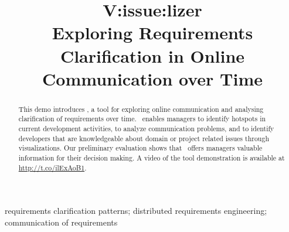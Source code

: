 
\title{V:issue:lizer\\Exploring Requirements Clarification in Online Communication over Time}


\author{
}

\maketitle


\begin{abstract}
This demo introduces \viss, a tool for exploring online communication and analysing clarification of requirements over time.
\viss\ enables managers to identify hotspots in current development activities, to analyze communication problems, and to identify developers that are knowledgeable about domain or project related issues through visualizations.
Our preliminary evaluation shows that \viss\ offers managers valuable information for their decision making.
A video of the tool demonstration is available at \url{http://t.co/ilExAoB1}.
\end{abstract}

\begin{IEEEkeywords}
requirements clarification patterns; distributed requirements engineering; communication of requirements
\end{IEEEkeywords}
